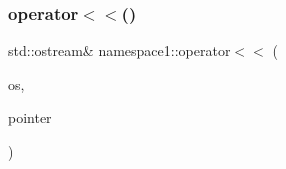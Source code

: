 \mbox{\label{namespacenamespace1_ac377ddc8113167c034b1e3d7a7c6262d}} 
\subsubsection{\texorpdfstring{operator$<$$<$()}{operator<<()}\hspace{0.1cm}{\footnotesize\ttfamily [2/2]}}
{\footnotesize\ttfamily std\+::ostream\& namespace1\+::operator$<$$<$ (\begin{DoxyParamCaption}\item[{std\+::ostream \&}]{os,  }\item[{const \hyperlink{classnamespace1_1_1_my_type_in_name_space1}{My\+Type\+In\+Name\+Space1} $\ast$}]{pointer }\end{DoxyParamCaption})}

